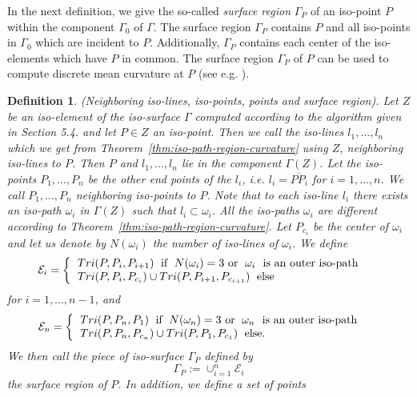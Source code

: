 \documentclass[a4paper,11pt]{article}
\newtheorem{definition}[theorem]{Definition}
\begin{document}
In the next definition, we give the so-called {\it surface region} $\Gamma_P$ of an iso-point $P$ within the
component $\Gamma_0$ of $\Gamma$. The surface region $\Gamma_P$ contains $P$ and all iso-points in $\Gamma_0$
which are incident to $P$. Additionally, $\Gamma_P$ contains each center of the iso-elements which have $P$ in
common. The surface region $\Gamma_P$ of $P$ can be used to compute discrete mean curvature at $P$
(see e.g. \cite{Meyer02Vismath}).

\begin{definition}(Neighboring iso-lines, iso-points, points and surface region). Let $Z$ be an
iso-element of the iso-surface $\Gamma$ computed according to the algorithm given in Section 5.4.
and let $P\in Z$ an iso-point. Then we call the iso-lines $l_1,\ldots,l_n$ which we get from
Theorem~\ref{thm:iso-path-region-curvature} using $Z$, neighboring iso-lines to $P$. Then
$P$ and $l_1,\ldots,l_n$ lie in the component $\Gamma(Z)$. Let the iso-points $P_1,\ldots,P_n$ be
the other end points of the $l_i$, i.e. $l_i=\overline{PP_i}$ for $i=1,\ldots,n$.
We call $P_1,\ldots,P_n$ neighboring iso-points to $P$. Note that to each iso-line $l_i$ there exists an
iso-path $\omega_i$ in $\Gamma(Z)$ such that $l_i\subset \omega_i$. All the iso-paths
$\omega_i$ are different according to Theorem~\ref{thm:iso-path-region-curvature}.
Let $P_{c_i}$ be the center of $\omega_i$ and let us denote by $N(\omega_i)$ the number of iso-lines
of $\omega_i$. We define
\begin{equation*}
\mathcal{E}_i=\left\{\begin{tabular}{ll}
$Tri(P,P_i,P_{i+1})$\;\mbox{ if }\;$N(\omega_i)=3$\mbox{ or }\;$\omega_i$ \mbox{ is an outer iso-path}&\mbox{}\\
$Tri(P,P_i,P_{c_i})\cup Tri(P,P_{i+1},P_{c_{i+1}})$\;\mbox{ else}&\mbox{}
\end{tabular}\right.
\end{equation*}
for $i=1,\ldots,n-1$, and
\begin{equation*}
\mathcal{E}_n=\left\{\begin{tabular}{ll}
$Tri(P,P_n,P_1)$\;\mbox{ if }\;$N(\omega_n)=3$\mbox{ or }\;$\omega_n$ \mbox{ is an outer iso-path}&\mbox{}\\
$Tri(P,P_n,P_{c_n})\cup Tri(P,P_1,P_{c_1})$\;\mbox{ else}.&\mbox{}
\end{tabular}\right.
\end{equation*}
We then call the piece of iso-surface $\Gamma_P$ defined by
\[
\Gamma_P:=\cup_{i=1}^n\mathcal{E}_i
\]
the surface region of $P$. In addition, we define a set of points

\end{definition}
\end{document}
